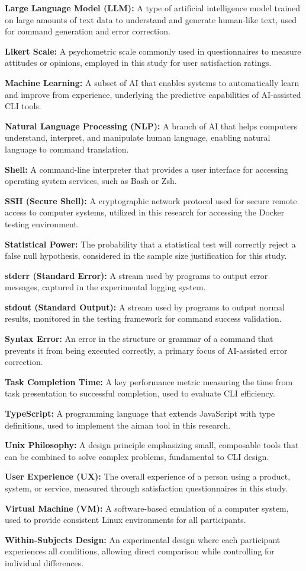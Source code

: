 \textbf{Large Language Model (LLM):} A type of artificial intelligence model trained on large amounts of text data to understand and generate human-like text, used for command generation and error correction.

\textbf{Likert Scale:} A psychometric scale commonly used in questionnaires to measure attitudes or opinions, employed in this study for user satisfaction ratings.

\textbf{Machine Learning:} A subset of AI that enables systems to automatically learn and improve from experience, underlying the predictive capabilities of AI-assisted CLI tools.

\textbf{Natural Language Processing (NLP):} A branch of AI that helps computers understand, interpret, and manipulate human language, enabling natural language to command translation.

\textbf{Shell:} A command-line interpreter that provides a user interface for accessing operating system services, such as Bash or Zsh.

\textbf{SSH (Secure Shell):} A cryptographic network protocol used for secure remote access to computer systems, utilized in this research for accessing the Docker testing environment.

\textbf{Statistical Power:} The probability that a statistical test will correctly reject a false null hypothesis, considered in the sample size justification for this study.

\textbf{stderr (Standard Error):} A stream used by programs to output error messages, captured in the experimental logging system.

\textbf{stdout (Standard Output):} A stream used by programs to output normal results, monitored in the testing framework for command success validation.

\textbf{Syntax Error:} An error in the structure or grammar of a command that prevents it from being executed correctly, a primary focus of AI-assisted error correction.

\textbf{Task Completion Time:} A key performance metric measuring the time from task presentation to successful completion, used to evaluate CLI efficiency.

\textbf{TypeScript:} A programming language that extends JavaScript with type definitions, used to implement the aiman tool in this research.

\textbf{Unix Philosophy:} A design principle emphasizing small, composable tools that can be combined to solve complex problems, fundamental to CLI design.

\textbf{User Experience (UX):} The overall experience of a person using a product, system, or service, measured through satisfaction questionnaires in this study.

\textbf{Virtual Machine (VM):} A software-based emulation of a computer system, used to provide consistent Linux environments for all participants.

\textbf{Within-Subjects Design:} An experimental design where each participant experiences all conditions, allowing direct comparison while controlling for individual differences.

